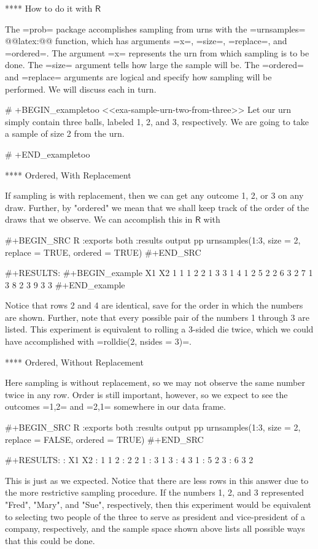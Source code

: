 **** How to do it with \(\mathsf{R}\) 

The =prob= package \cite{prob} accomplishes sampling from urns with
the =urnsamples= @@latex:@@
function, which has arguments =x=, =size=, =replace=, and
=ordered=. The argument =x= represents the urn from which sampling is
to be done. The =size= argument tells how large the sample will
be. The =ordered= and =replace= arguments are logical and specify how
sampling will be performed. We will discuss each in turn.

# +BEGIN_exampletoo
<<exa-sample-urn-two-from-three>> Let our urn simply contain three
balls, labeled 1, 2, and 3, respectively. We are going to take a
sample of size 2 from the urn.

# +END_exampletoo

**** Ordered, With Replacement

If sampling is with replacement, then we can get any outcome 1, 2, or
3 on any draw. Further, by "ordered" we mean that we shall keep
track of the order of the draws that we observe. We can accomplish
this in \(\mathsf{R}\) with

#+BEGIN_SRC R :exports both :results output pp  
urnsamples(1:3, size = 2, replace = TRUE, ordered = TRUE)
#+END_SRC 

#+RESULTS:
#+BEGIN_example
  X1 X2
1  1  1
2  2  1
3  3  1
4  1  2
5  2  2
6  3  2
7  1  3
8  2  3
9  3  3
#+END_example

Notice that rows 2 and 4 are identical, save for the order in which
the numbers are shown. Further, note that every possible pair of the
numbers 1 through 3 are listed. This experiment is equivalent to
rolling a 3-sided die twice, which we could have accomplished with
=rolldie(2, nsides = 3)=.

**** Ordered, Without Replacement

Here sampling is without replacement, so we may not observe the same
number twice in any row. Order is still important, however, so we
expect to see the outcomes =1,2= and =2,1= somewhere in our data
frame.

#+BEGIN_SRC R :exports both :results output pp   
urnsamples(1:3, size = 2, replace = FALSE, ordered = TRUE)
#+END_SRC

#+RESULTS:
:   X1 X2
: 1  1  2
: 2  2  1
: 3  1  3
: 4  3  1
: 5  2  3
: 6  3  2

This is just as we expected. Notice that there are less rows in this
answer due to the more restrictive sampling procedure. If the numbers
1, 2, and 3 represented "Fred", "Mary", and "Sue", respectively,
then this experiment would be equivalent to selecting two people of
the three to serve as president and vice-president of a company,
respectively, and the sample space shown above lists all possible ways
that this could be done.

